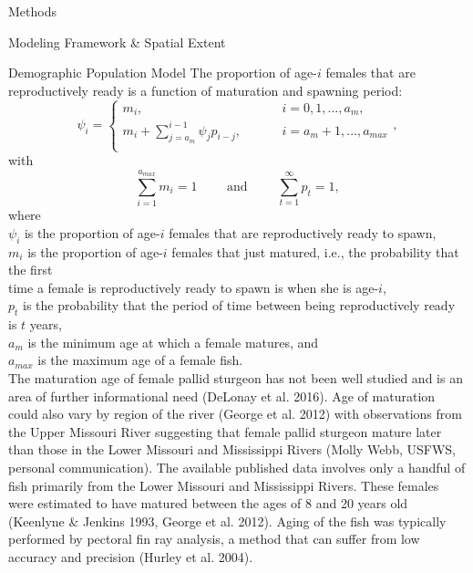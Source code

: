 \documentclass[12pt]{article}
\begin{document}
\begin{section}{Methods}
\begin{subsection}{Modeling Framework \& Spatial Extent}
\begin{subsubsection}{Demographic Population Model}
\vspace{-6pt}The proportion of age-$i$ females that are reproductively ready is a function of maturation and spawning period:
\begin{equation}
\psi_i = \begin{cases}
m_i, & \hspace{1cm} i=0, 1, \ldots, a_m,\\
m_i + \sum_{j=a_{m}}^{i-1}\psi_{j}p_{i-j},  & \hspace{1cm} i=a_m+1, \ldots, a_{max}\\
\end{cases},
\label{psii}
\end{equation}
with
\begin{equation}
\sum_{i=1}^{a_{max}} m_i=1 \hspace{24pt} \mbox{ and } \hspace{24pt} \sum_{t=1}^{\infty} p_t =1,
\end{equation}
where\\ 
\hspace*{0.5cm}$\psi_i$ is the proportion of age-$i$ females that are reproductively ready to spawn,\\
\hspace*{0.5cm}$m_i$ is the proportion of age-$i$ females that just matured, i.e., the probability that the first\\ 
\hspace*{1.5cm}time a female is reproductively ready to spawn is when she is age-$i$,\\
\hspace*{0.5cm}$p_t$  is the probability that the period of time between being reproductively ready is $t$ years,\\
\hspace*{0.5cm}$a_m$ is the minimum age at which a female matures, and\\
\hspace*{0.5cm}$a_{max}$ is the maximum age of a female fish.\\


The maturation age of female pallid sturgeon has not been well studied and is an area of further informational need (DeLonay et al. 2016).  Age of maturation could also vary by region of the river (George et al. 2012) with observations from the Upper Missouri River suggesting that female pallid sturgeon mature later than those in the Lower Missouri and Mississippi Rivers (Molly Webb, USFWS, personal communication).  The available published data involves only a handful of fish primarily from the Lower Missouri and Mississippi Rivers.   These females were estimated to have matured between the ages of 8 and 20 years old (Keenlyne \& Jenkins 1993, George et al. 2012).  Aging of the fish was typically performed by pectoral fin ray analysis, a method that can suffer from low accuracy and precision (Hurley et  al. 2004). 



\end{subsubsection}
\end{subsection}
\end{section}
\end{document}
